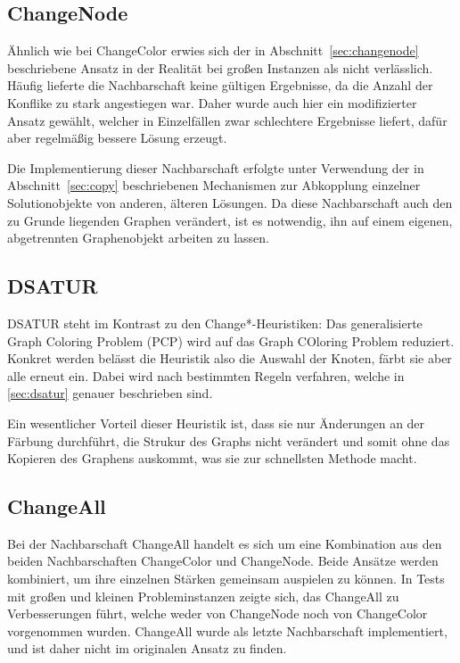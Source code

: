\subsection{ChangeNode}
Ähnlich wie bei ChangeColor erwies sich der in Abschnitt~\ref{sec:changenode} beschriebene Ansatz in der Realität bei großen Instanzen als nicht verlässlich. Häufig lieferte die Nachbarschaft keine gültigen
Ergebnisse, da die Anzahl der Konflike zu stark angestiegen war. Daher wurde auch hier ein modifizierter Ansatz gewählt, welcher in Einzelfällen zwar schlechtere Ergebnisse liefert, dafür aber regelmäßig
bessere Lösung erzeugt.

Die Implementierung dieser Nachbarschaft erfolgte unter Verwendung der in Abschnitt~\ref{sec:copy} beschriebenen Mechanismen zur Abkopplung einzelner Solutionobjekte von anderen, älteren Lösungen. Da diese 
Nachbarschaft auch den zu Grunde liegenden Graphen verändert, ist es notwendig, ihn auf einem eigenen, abgetrennten Graphenobjekt arbeiten zu lassen. 

\subsection{DSATUR}
DSATUR steht im Kontrast zu den Change*-Heuristiken: Das generalisierte Graph Coloring Problem (PCP) wird auf das Graph COloring Problem reduziert. Konkret werden belässt die Heuristik also die Auswahl der Knoten, färbt sie aber alle erneut ein. Dabei wird nach bestimmten Regeln verfahren, welche in \ref{sec:dsatur} genauer beschrieben sind.

Ein wesentlicher Vorteil dieser Heuristik ist, dass sie nur Änderungen an der Färbung durchführt, die Strukur des Graphs nicht verändert und somit ohne das Kopieren des Graphens auskommt, was sie zur schnellsten Methode macht.

\subsection{ChangeAll}
Bei der Nachbarschaft ChangeAll handelt es sich um eine Kombination aus den beiden Nachbarschaften ChangeColor und ChangeNode. Beide Ansätze werden kombiniert, um ihre einzelnen Stärken gemeinsam auspielen
zu können. In Tests mit großen und kleinen Probleminstanzen zeigte sich, das ChangeAll zu Verbesserungen führt, welche weder von ChangeNode noch von ChangeColor vorgenommen wurden. ChangeAll wurde als letzte
Nachbarschaft implementiert, und ist daher nicht im originalen Ansatz zu finden.

